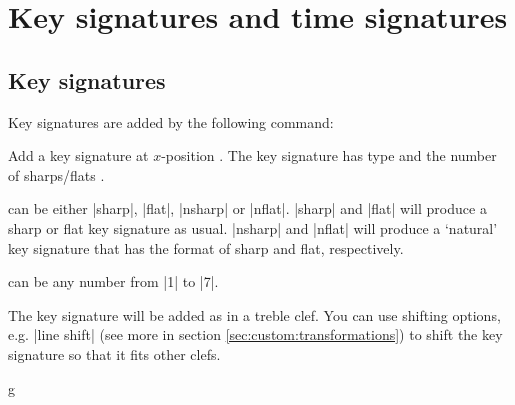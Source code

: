 \section{Key signatures and time signatures}\label{sec:signatures}
\subsection{Key signatures}\label{sec:signatures:key}
Key signatures are added by the following command:
\begin{command}{\tmkeysignature{}}
  Add a key signature at $x$-position . The key signature has type 
   and the number of \mbox{sharps/flats} .

   can be either |sharp|, |flat|, |nsharp| or |nflat|. |sharp| and 
  |flat| will produce a sharp or flat key signature as usual. |nsharp| and 
  |nflat| will produce a `natural' key signature that has the format of sharp and 
  flat, respectively.
  
   can be any number from |1| to |7|.

  The key signature will be added as in a treble clef. You can use shifting options, 
  e.g. |line shift| (see more in section \ref{sec:custom:transformations}) 
  to shift the key signature so that it fits other clefs.
\end{command}
\begin{codeexample}[]
\begin{tmline}
\begin{tmstaff}{g}{}
\end{tmstaff}
\end{tmline}
\end{codeexample}
